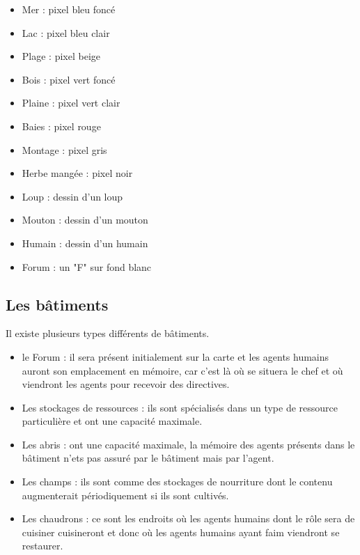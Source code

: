 \documentclass[12pt]{article}
\begin{document}
	\begin{itemize}

	\item Mer : pixel bleu foncé
	\item Lac : pixel bleu clair
	\item Plage : pixel beige 
	\item Bois : pixel vert foncé
	\item Plaine : pixel vert clair
	\item Baies : pixel rouge
	\item Montage : pixel gris
	\item Herbe mangée : pixel noir
	\item Loup : dessin d'un loup
	\item Mouton : dessin d'un mouton
	\item Humain : dessin d'un humain
	\item Forum : un "F" sur fond blanc

	\end {itemize}

	\subsection{Les bâtiments}

Il existe plusieurs types différents de bâtiments.\\

	\begin{itemize}
	
	\item le Forum : il sera présent initialement sur la carte et les 
agents humains auront son emplacement en mémoire, car c'est là où se situera 
le chef et où viendront les agents pour recevoir des directives.

	\item Les stockages de ressources : ils sont spécialisés dans un type 
de ressource particulière et ont une capacité maximale.

	\item Les abris : ont une capacité maximale, la mémoire des agents 
présents dans le bâtiment n'ets pas assuré par le bâtiment mais par l'agent.

	\item Les champs : ils sont comme des stockages de nourriture dont 
le contenu augmenterait périodiquement si ils sont cultivés.

	\item Les chaudrons : ce sont les endroits où les agents humains dont 
le rôle sera de cuisiner cuisineront et donc où les agents humains ayant faim 
viendront se restaurer.

	\end{itemize}
\end{document}
